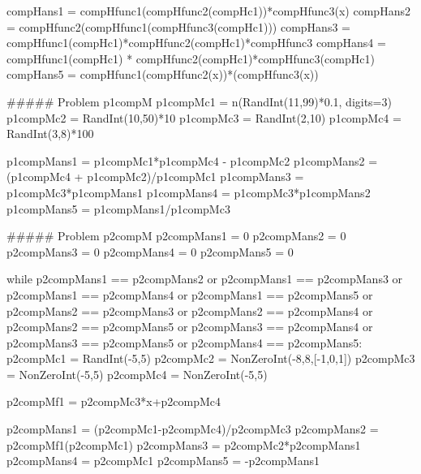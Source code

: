 \documentclass{ximera}
\begin{document}
\begin{MCQuestions}
\begin{sagesilent}
    compHans1 = compHfunc1(compHfunc2(compHc1))*compHfunc3(x)
    compHans2 = compHfunc2(compHfunc1(compHfunc3(compHc1)))
    compHans3 = compHfunc1(compHc1)*compHfunc2(compHc1)*compHfunc3
    compHans4 = compHfunc1(compHc1) * compHfunc2(compHc1)*compHfunc3(compHc1)
    compHans5 = compHfunc1(compHfunc2(x))*(compHfunc3(x))

\end{sagesilent}








\begin{sagesilent}

##### Problem p1compM
p1compMc1 = n(RandInt(11,99)*0.1, digits=3)
p1compMc2 = RandInt(10,50)*10
p1compMc3 = RandInt(2,10)
p1compMc4 = RandInt(3,8)*100

p1compMans1 = p1compMc1*p1compMc4 - p1compMc2
p1compMans2 = (p1compMc4 + p1compMc2)/p1compMc1
p1compMans3 = p1compMc3*p1compMans1
p1compMans4 = p1compMc3*p1compMans2
p1compMans5 = p1compMans1/p1compMc3



##### Problem p2compM
p2compMans1 = 0
p2compMans2 = 0
p2compMans3 = 0
p2compMans4 = 0
p2compMans5 = 0

while p2compMans1 == p2compMans2 or p2compMans1 == p2compMans3 or p2compMans1 == p2compMans4 or p2compMans1 == p2compMans5 or p2compMans2 == p2compMans3 or p2compMans2 == p2compMans4 or p2compMans2 == p2compMans5 or p2compMans3 == p2compMans4 or p2compMans3 == p2compMans5 or p2compMans4 == p2compMans5:
    p2compMc1 = RandInt(-5,5)
    p2compMc2 = NonZeroInt(-8,8,[-1,0,1])
    p2compMc3 = NonZeroInt(-5,5)
    p2compMc4 = NonZeroInt(-5,5)
    
    p2compMf1 = p2compMc3*x+p2compMc4
    
    p2compMans1 = (p2compMc1-p2compMc4)/p2compMc3
    p2compMans2 = p2compMf1(p2compMc1)
    p2compMans3 = p2compMc2*p2compMans1
    p2compMans4 = p2compMc1
    p2compMans5 = -p2compMans1




\end{sagesilent}
\end{MCQuestions}
\end{document}
